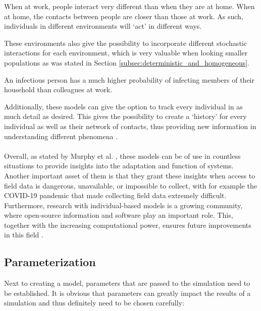 \begin{example}
\label{example:different_behaviour}
When at work, people interact very different than when they are at home. When at home, the contacts between people are closer than those at work. As such, individuals in different environments will `act' in different ways.
\end{example}

\noindent These environments also give the possibility to incorporate different stochastic interactions for each environment, which is very valuable when looking smaller populations as was stated in Section \ref{subsec:deterministic_and_homogeneous}.

\begin{example}
\label{example:different_stochasticity}
An infectious person has a much higher probability of infecting members of their household than colleagues at work.
\end{example}

Additionally, these models can give the option to track every individual in as much detail as desired. This gives the possibility to create a `history' for every individual as well as their network of contacts, thus providing new information in understanding different phenomena \cite{lander_lessons_decade}.
\\\\
Overall, as stated by Murphy et al. \cite{introduction_agent-based_models}, these models can be of use in countless situations to provide insights into the adaptation and function of systems. Another important asset of them is that they grant these insights when access to field data is dangerous, unavailable, or impossible to collect, with for example the COVID-19 pandemic that made collecting field data extremely difficult. Furthermore, research with individual-based models is a growing community, where open-source information and software play an important role. This, together with the increasing computational power, ensures future improvements in this field \cite{introduction_agent-based_models, abm_surging_tool}.

\subsection{Parameterization}
\label{subsec:parameterization}

Next to creating a model, parameters that are passed to the simulation need to be established. It is obvious that parameters can greatly impact the results of a simulation and thus definitely need to be chosen carefully:

